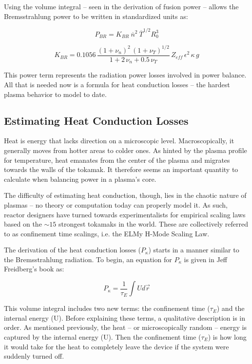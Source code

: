 Using the volume integral -- seen in the derivation of fusion power -- allows the Bremsstrahlung power to be written in standardized units as:

\begin{equation}
	\label{eq:pbr}
	P_{BR} = K_{BR} \ \overline n ^ 2 \ \overline T ^ {1/2} R_0^3 
\end{equation}

\begin{equation}
	K_{BR} = 0.1056 \, \frac{ (1+\nu_n)^2 \, (1+\nu_T)^{1/2} }{1+2 \, \nu_n + 0.5 \, \nu_T} \, Z_{eff} \, \epsilon^2 \, \kappa \, g
\end{equation}

This power term represents the radiation power losses involved in power balance. All that is needed now is a formula for heat conduction losses -- the hardest plasma behavior to model to date.

\subsection{Estimating Heat Conduction Losses}

Heat is energy that lacks direction on a microscopic level. Macroscopically, it generally moves from hotter areas to colder ones. As hinted by the plasma profile for temperature, heat emanates from the center of the plasma and migrates towards the walls of the tokamak. It therefore seems an important quantity to calculate when balancing power in a plasma's core.

The difficulty of estimating heat conduction, though, lies in the chaotic nature of plasmas -- no theory or computation today can properly model it. As such, reactor designers have turned towards experimentalists for empirical scaling laws based on the $\sim15$ strongest tokamaks in the world. These are collectively referred to as confinement time scalings, i.e. the ELMy H-Mode Scaling Law.

The derivation of the heat conduction losses ($P_\kappa$) starts in a manner similar to the Bremsstrahlung radiation. To begin, an equation for $P_\kappa$ is given in Jeff Freidberg's book as:

\begin{equation}
	P_\kappa = \frac{1}{\tau_E} \int U d \vec r
\end{equation}

This volume integral includes two new terms: the confinement time ($\tau_E$) and the internal energy (U). Before explaining these terms, a qualitative description is in order. As mentioned previously, the heat -- or microscopically random -- energy is captured by the internal energy (U). Then the confinement time ($\tau_E$) is how long it would take for the heat to completely leave the device if the system were suddenly turned off.

